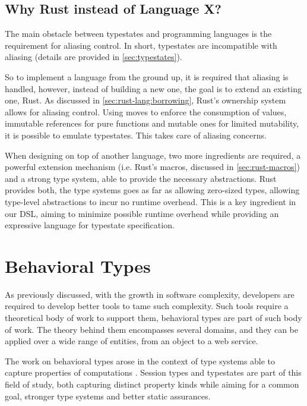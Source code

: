 \subsection{Why Rust instead of Language X?}

The main obstacle between typestates and programming languages is the requirement for aliasing control.
In short, typestates are incompatible with aliasing (details are provided in \autoref{sec:typestates}).

So to implement a language from the ground up, it is required that aliasing is handled,
however, instead of building a new one, the goal is to extend an existing one, Rust.
As discussed in \autoref{sec:rust-lang:borrowing}, Rust's ownership system allows for aliasing control.
Using moves to enforce the consumption of values,
immutable references for pure functions and mutable ones for limited mutability,
it is possible to emulate typestates. This takes care of aliasing concerns.

When designing on top of another language, two more ingredients are required,
a powerful extension mechanism (i.e. Rust's macros, discussed in \autoref{sec:rust-macros})
and a strong type system, able to provide the necessary abstractions.
Rust provides both, the type systems goes as far as allowing zero-sized types,
allowing type-level abstractions to incur no runtime overhead.
This is a key ingredient in our DSL, aiming to minimize possible runtime overhead while providing an expressive language for typestate specification.

\section{Behavioral Types}\label{sec:behavioral-types}

As previously discussed, with the growth in software complexity, developers are required to develop better tools to tame such complexity.
Such tools require a theoretical body of work to support them, behavioral types are part of such body of work.
The theory behind them encompasses several domains, and they can be applied over a wide range of entities, from an object to a web service.

The work on behavioral types arose in the context of type systems able to capture properties of computations \autocite{Huttel2016}.
Session types and typestates are part of this field of study,
both capturing distinct property kinds while aiming for a common goal,
stronger type systems and better static assurances.

